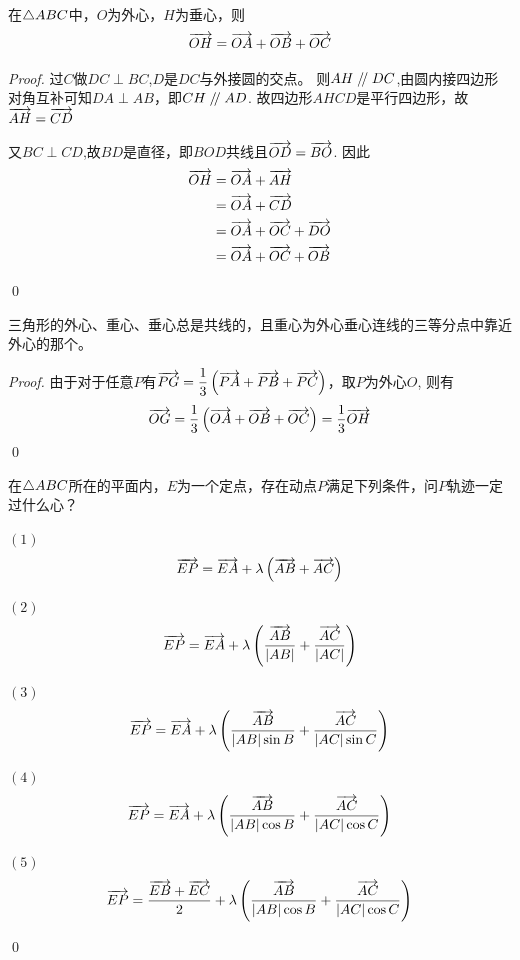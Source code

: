 \begin{lemma}在\(\triangle ABC\)中，\(O\)为外心，\(H\)为垂心，则
    \begin{equation}
        \overrightarrow{OH}=\overrightarrow{OA}+\overrightarrow{OB}+\overrightarrow{OC}
    \end{equation}
\end{lemma}
\begin{proof}
    过\(C\)做\(DC\perp BC\),\(D\)是\(DC\)与外接圆的交点。
    则\(AH\kern 0.56em/\kern -0.8em /\kern 0.56em DC\),由圆内接四边形对角互补可知\(DA\perp AB\)，即\(CH\kern 0.56em/\kern -0.8em /\kern 0.56em AD\).
    故四边形\(AHCD\)是平行四边形，故\(\overrightarrow{AH}=\overrightarrow{CD}\)

    又\(BC\perp CD\),故\(BD\)是直径，即\(BOD\)共线且\(\overrightarrow{OD}=\overrightarrow{BO}\).
    因此\begin{align*}
        \overrightarrow{OH}&=\overrightarrow{OA}+\overrightarrow{AH}\\
               &=\overrightarrow{OA}+\overrightarrow{CD}\\
               &=\overrightarrow{OA}+\overrightarrow{OC}+\overrightarrow{DO}\\
               &=\overrightarrow{OA}+\overrightarrow{OC}+\overrightarrow{OB}
    \end{align*}


    \qed
\end{proof}
\begin{theorem}[Euler线]
    三角形的外心、重心、垂心总是共线的，且重心为外心垂心连线的三等分点中靠近外心的那个。 
\end{theorem}
\begin{proof}
    由于对于任意\(P\)有\(\overrightarrow{PG}=\dfrac{1}{3}\left(\overrightarrow{PA}+\overrightarrow{PB}+\overrightarrow{PC}\right)\)，取\(P\)为外心\(O\),
    则有\[\overrightarrow{OG}=\frac{1}{3}\left(\overrightarrow{OA}+\overrightarrow{OB}+\overrightarrow{OC}\right)=\dfrac{1}{3}\overrightarrow{OH}\]
    \qed
\end{proof}


\begin{example}
    在\(\triangle ABC\)所在的平面内，\(E\)为一个定点，存在动点\(P\)满足下列条件，问\(P\)轨迹一定过什么心？

    \((1)\)\[\overrightarrow{EP}=\overrightarrow{EA}+\lambda\left(\overrightarrow{AB}+\overrightarrow{AC}\right)\]

    \((2)\)\[\overrightarrow{EP}=\overrightarrow{EA}+\lambda\left(\frac{\overrightarrow{AB}}{|AB|}+\frac{\overrightarrow{AC}}{|AC|}\right)\]

    \((3)\)\[\overrightarrow{EP}=\overrightarrow{EA}+\lambda\left(\frac{\overrightarrow{AB}}{|AB|\sin B}+\frac{\overrightarrow{AC}}{|AC|\sin C}\right)\]

    \((4)\)\[\overrightarrow{EP}=\overrightarrow{EA}+\lambda\left(\frac{\overrightarrow{AB}}{|AB|\cos B}+\frac{\overrightarrow{AC}}{|AC|\cos C}\right)\]

    \((5)\)\[\overrightarrow{EP}=\dfrac{\overrightarrow{EB}+\overrightarrow{EC}}{2}+\lambda\left(\frac{\overrightarrow{AB}}{|AB|\cos B}+\frac{\overrightarrow{AC}}{|AC|\cos C}\right)\]
\end{example}
\begin{jie}
    \qed
\end{jie}





















\clearpage
